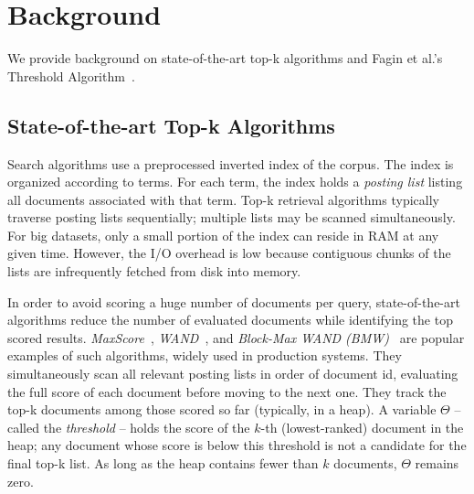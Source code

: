 
\section{Background}
\label{sec:background}

We  provide background on  state-of-the-art top-k algorithms and Fagin et al.'s Threshold Algorithm~\cite{Fagin:2003}.

\subsection{State-of-the-art Top-k Algorithms}

Search algorithms use a preprocessed inverted index of the corpus. The index is organized according to terms. For each term, the index holds a \emph{posting list} listing all documents associated with that term. Top-k retrieval algorithms typically traverse  posting lists sequentially; multiple lists may be scanned simultaneously. For big datasets, only a small portion of the index can reside in RAM at any given time. However, the I/O overhead is low because 
contiguous chunks of the lists are infrequently fetched from disk into memory.

In order to avoid scoring a huge number of documents per query, state-of-the-art algorithms reduce the number of evaluated documents while identifying the top scored results. 
{\em MaxScore}~\cite{Strohman:2005,Turtle:1995}, {\em WAND}~\cite{Broder:2003}, and {\em Block-Max WAND (BMW)}~\cite{Ding:2011} are popular examples of such algorithms, widely used in production systems. 
They  simultaneously scan all relevant posting lists in order of document id, evaluating the full score of each document before moving to the next one. They track the top-k documents among those scored so far (typically, in a heap). A variable $\Theta$ -- called the \emph{threshold} -- holds the score of the $k$-th (lowest-ranked) document in the heap;  any document whose  score is below this threshold is not a candidate for the final top-k list. As long as the heap contains fewer than $k$ documents, $\Theta$ remains zero.

